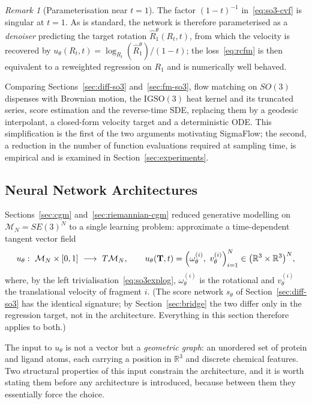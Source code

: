 \documentclass[a4paper,12pt]{article}
\theoremstyle{remark}
\newtheorem{remark}[theorem]{Remark}
\begin{document}
\begin{remark}[Parameterisation near $t=1$]
\label{rem:sing}
The factor $(1-t)^{-1}$ in~\eqref{eq:so3-cvf} is singular at $t=1$. As is standard, the
network is therefore parameterised as a \emph{denoiser} predicting the target rotation
$\widehat R_1^\theta(R_t,t)$, from which the velocity is recovered by
$u_\theta(R_t,t)=\log_{R_t}(\widehat R_1^\theta)/(1-t)$; the loss~\eqref{eq:rcfm} is then
equivalent to a reweighted regression on $R_1$ and is numerically well behaved.
\end{remark}

Comparing Sections~\ref{sec:diff-so3} and~\ref{sec:fm-so3}, flow matching on $SO(3)$
dispenses with Brownian motion, the $\mathrm{IGSO}(3)$ heat kernel and its truncated
series, score estimation and the reverse-time SDE, replacing them by a geodesic
interpolant, a closed-form velocity target and a deterministic ODE. This simplification
is the first of the two arguments motivating SigmaFlow; the second, a reduction in the
number of function evaluations required at sampling time, is empirical and is examined in
Section~\ref{sec:experiments}.








\subsection{Neural Network Architectures}
\label{sec:architectures}

Sections~\ref{sec:cgm} and~\ref{sec:riemannian-cgm} reduced generative modelling on
$\mathcal M_N=SE(3)^N$ to a single learning problem: approximate a time-dependent
tangent vector field
\begin{equation}
\label{eq:network-signature}
u_\theta:\ \mathcal M_N\times[0,1]\ \longrightarrow\ T\mathcal M_N,
\qquad
u_\theta(\mathbf T,t)
=
\Bigl(\omega^{(i)}_\theta,\ v^{(i)}_\theta\Bigr)_{i=1}^{N}
\in
\bigl(\mathbb R^3\times\mathbb R^3\bigr)^{N},
\end{equation}
where, by the left trivialisation~\eqref{eq:so3explog}, $\omega^{(i)}_\theta$ is the
rotational and $v^{(i)}_\theta$ the translational velocity of fragment $i$. (The score
network $s_\theta$ of Section~\ref{sec:diff-so3} has the identical signature; by
Section~\ref{sec:bridge} the two differ only in the regression target, not in the
architecture. Everything in this section therefore applies to both.)

The input to $u_\theta$ is not a vector but a \emph{geometric graph}: an unordered set of
protein and ligand atoms, each carrying a position in $\mathbb R^3$ and discrete
chemical features. Two structural properties of this input constrain the architecture,
and it is worth stating them before any architecture is introduced, because between them
they essentially force the choice.
\end{document}
